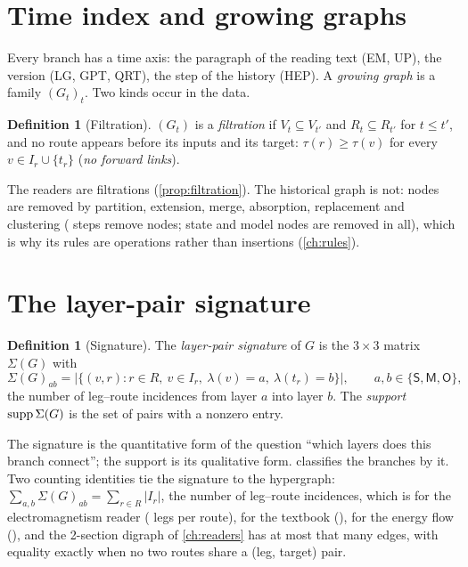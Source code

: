 \documentclass[11pt,a4paper,twoside,openany]{report}
\theoremstyle{plain}
\theoremstyle{definition}
\newtheorem{definition}[theorem]{Definition}
\theoremstyle{remark}
\newcommand{\lay}[1]{\mathsf{#1}}
\begin{document}
\section{Time index and growing graphs}
Every branch has a time axis: the paragraph of the reading text (EM, UP), the version (LG, GPT, QRT), the step of the history (HEP). A \emph{growing graph} is a family $(G_t)_{t}$. Two kinds occur in the data.
\begin{definition}[Filtration]
$(G_t)$ is a \emph{filtration} if $V_t\subseteq V_{t'}$ and $R_t\subseteq R_{t'}$ for $t\le t'$, and no route appears before its inputs and its target: $\tau(r)\ge\tau(v)$ for every $v\in I_r\cup\{t_r\}$ (\emph{no forward links}).
\end{definition}
The readers are filtrations (\cref{prop:filtration}). The historical graph is not: nodes are removed by partition, extension, merge, absorption, replacement and clustering (\NhepRemovalEvents{} steps remove nodes; \NhepRemovedSNodes{} state and \NhepRemovedMNodes{} model nodes are removed in all), which is why its rules are operations rather than insertions (\cref{ch:rules}).

\section{The layer-pair signature}
\begin{definition}[Signature]\label{def:signature}
The \emph{layer-pair signature} of $G$ is the $3\times 3$ matrix $\Sigma(G)$ with
\[\Sigma(G)_{ab}=\big|\{(v,r): r\in R,\ v\in I_r,\ \lambda(v)=a,\ \lambda(t_r)=b\}\big|,\qquad a,b\in\{\lay S,\lay M,\lay O\},\]
the number of leg--route incidences from layer $a$ into layer $b$. The \emph{support} $\operatorname{supp}\Sigma(G)$ is the set of pairs with a nonzero entry.
\end{definition}
The signature is the quantitative form of the question ``which layers does this branch connect''; the support is its qualitative form.  classifies the branches by it. Two counting identities tie the signature to the hypergraph: $\sum_{a,b}\Sigma(G)_{ab}=\sum_{r\in R}|I_r|$, the number of leg--route incidences, which is \NEMIncidences{} for the electromagnetism reader (\NEMMeanLegs{} legs per route), \NUPIncidences{} for the textbook (\NUPMeanLegs), \NLGIncidences{} for the energy flow (\NLGMeanLegs), and the 2-section digraph of \cref{ch:readers} has at most that many edges, with equality exactly when no two routes share a (leg, target) pair.
\end{document}
